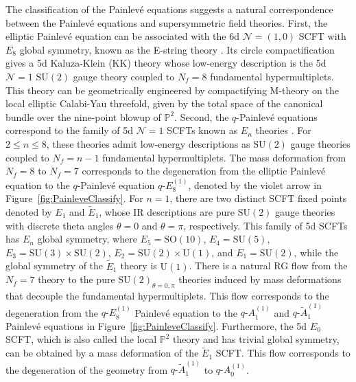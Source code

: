 \documentclass[11pt, a4paper]{article}
\theoremstyle{definition}
\begin{document}
The classification of the Painlev\'e equations suggests a natural correspondence between the Painlev\'e equations and supersymmetric field theories. First, the elliptic Painlev\'e equation can be associated with the 6d $ \mathcal{N}=(1,0) $ SCFT with $ E_8 $ global symmetry, known as the E-string theory \cite{Ganor:1996mu, Seiberg:1996vs}. Its circle compactification gives a 5d Kaluza-Klein (KK) theory whose low-energy description is the 5d $ \mathcal{N}=1 $ $ \mathrm{SU}(2) $ gauge theory coupled to $ N_f=8 $ fundamental hypermultiplets. This theory can be geometrically engineered by compactifying M-theory on the local elliptic Calabi-Yau threefold, given by the total space of the canonical bundle over the nine-point blowup of $ \mathbb{P}^2 $. Second, the $ q $-Painlev\'e equations correspond to the family of 5d $ \mathcal{N}=1 $ SCFTs known as $ E_n $ theories \cite{Seiberg:1996bd, Morrison:1996xf}. For $ 2 \leq n \leq 8 $, these theories admit low-energy descriptions as $ \mathrm{SU}(2) $ gauge theories coupled to $ N_f=n-1 $ fundamental hypermultiplets. The mass deformation from $ N_f=8 $ to $ N_f=7 $ corresponds to the degeneration from the elliptic Painlev\'e equation to the $ q $-Painlev\'e equation $ q\text{-}E_8^{(1)} $, denoted by the violet arrow in Figure~\ref{fig:PainleveClassify}. For $ n=1 $, there are two distinct SCFT fixed points denoted by $ E_1 $ and $ \tilde{E}_1 $, whose IR descriptions are pure $ \mathrm{SU}(2) $ gauge theories with discrete theta angles $ \theta=0 $ and $ \theta=\pi $, respectively. This family of 5d SCFTs has $ E_n $ global symmetry, where $ E_5=\mathrm{SO}(10) $, $ E_4=\mathrm{SU}(5) $, $ E_3=\mathrm{SU}(3) \times \mathrm{SU}(2) $, $ E_2=\mathrm{SU}(2)\times \mathrm{U}(1) $, and $ E_1=\mathrm{SU}(2) $, while the global symmetry of the $ \tilde{E}_1 $ theory is $ \mathrm{U}(1) $. There is a natural RG flow from the $ N_f=7 $ theory to the pure $ \mathrm{SU}(2)_{\theta=0,\pi} $ theories induced by mass deformations that decouple the fundamental hypermultiplets. This flow corresponds to the degeneration from the $ q\text{-}E_8^{(1)} $ Painlev\'e equation to the $ q\text{-}A_1^{(1)} $ and $ q\text{-}\tilde{A}_1^{(1)} $ Painlev\'e equations in Figure~\ref{fig:PainleveClassify}. Furthermore, the 5d $ E_0 $ SCFT, which is also called the local $ \mathbb{P}^2 $ theory and has trivial global symmetry, can be obtained by a mass deformation of the $ \tilde{E}_1 $ SCFT. This flow corresponds to the degeneration of the geometry from $ q\text{-}\tilde{A}_1^{(1)} $ to $ q\text{-}A_0^{(1)} $.
\end{document}
